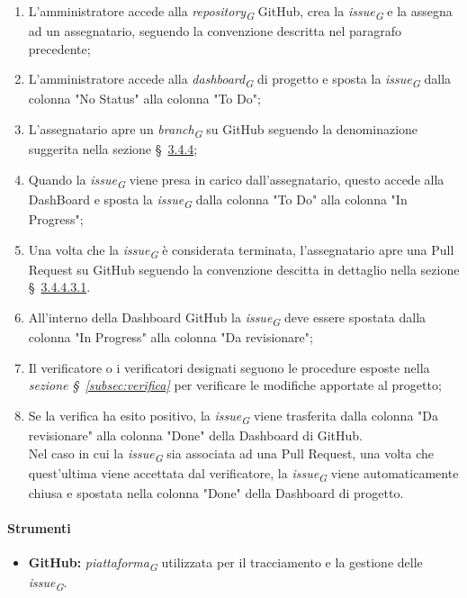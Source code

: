 \begin{enumerate}
		\item L'amministratore accede alla \textit{repository}\textsubscript{\textit{G}} GitHub, crea la \textit{issue}\textsubscript{\textit{G}} e la assegna ad un assegnatario, seguendo la convenzione descritta nel paragrafo precedente;
		\item L'amministratore accede alla \textit{dashboard}\textsubscript{\textit{G}} di progetto e sposta la \textit{issue}\textsubscript{\textit{G}} dalla colonna "No Status" alla colonna "To Do";
		\item L'assegnatario apre un \textit{branch}\textsubscript{\textit{G}} su GitHub seguendo la denominazione suggerita nella sezione \S~\hyperlink{subsubsec:sincronizzazione&branching}{3.4.4};
		\item Quando la \textit{issue}\textsubscript{\textit{G}} viene presa in carico dall'assegnatario, questo accede alla DashBoard e sposta la \textit{issue}\textsubscript{\textit{G}} dalla colonna "To Do" alla colonna "In Progress";
		\item Una volta che la \textit{issue}\textsubscript{\textit{G}} è considerata terminata, l'assegnatario apre una Pull Request su GitHub seguendo la convenzione descitta in dettaglio nella sezione \S~\hyperlink{par:creazionePR}{3.4.4.3.1}.
		\item All'interno della Dashboard GitHub la \textit{issue}\textsubscript{\textit{G}} deve essere spostata dalla colonna "In Progress" alla colonna "Da revisionare";
		\item Il verificatore o i verificatori designati seguono le procedure esposte nella \textit{sezione \S~\ref{subsec:verifica}} per verificare le modifiche apportate al progetto;
		\item Se la verifica ha esito positivo, la \textit{issue}\textsubscript{\textit{G}} viene trasferita dalla colonna "Da revisionare" alla colonna "Done" della Dashboard di GitHub. \\
		Nel caso in cui la \textit{issue}\textsubscript{\textit{G}} sia associata ad una Pull Request, una volta che quest'ultima viene accettata dal verificatore, la \textit{issue}\textsubscript{\textit{G}} viene automaticamente chiusa e spostata nella colonna "Done" della Dashboard di progetto. 
\end{enumerate}

\paragraph{Strumenti}
\begin{itemize}
	\item \textbf{GitHub:} \textit{piattaforma}\textsubscript{\textit{G}} utilizzata per il tracciamento e la gestione delle \textit{issue}\textsubscript{\textit{G}}.
\end{itemize}

